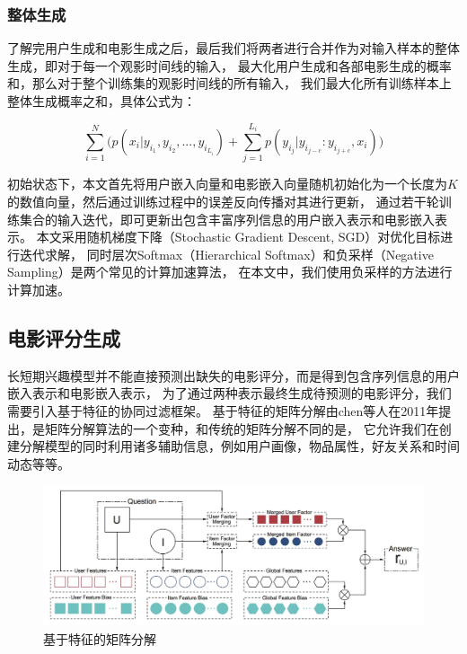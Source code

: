\subsubsection{整体生成}
了解完用户生成和电影生成之后，最后我们将两者进行合并作为对输入样本的整体生成，即对于每一个观影时间线的输入，
最大化用户生成和各部电影生成的概率和，那么对于整个训练集的观影时间线的所有输入，
我们最大化所有训练样本上整体生成概率之和，具体公式为：

\begin{equation}
\sum_{i=1}^{N} \bigg( p(x_i | y_{i_1}, y_{i_2}, ..., y_{i_{L_i}}) +
\sum_{j=1}^{L_i} p(y_{i_j} | y_{i_{j-c}} : y_{i_{j+c}}, x_i) \bigg)
\end{equation}

初始状态下，本文首先将用户嵌入向量和电影嵌入向量随机初始化为一个长度为$K$的数值向量，然后通过训练过程中的误差反向传播对其进行更新，
通过若干轮训练集合的输入迭代，即可更新出包含丰富序列信息的用户嵌入表示和电影嵌入表示。
本文采用随机梯度下降（Stochastic Gradient Descent, SGD）对优化目标进行迭代求解，
同时层次Softmax（Hierarchical Softmax）和负采样（Negative Sampling）是两个常见的计算加速算法，
在本文中，我们使用负采样的方法进行计算加速。

\subsection{电影评分生成}
长短期兴趣模型并不能直接预测出缺失的电影评分，而是得到包含序列信息的用户嵌入表示和电影嵌入表示，
为了通过两种表示最终生成待预测的电影评分，我们需要引入基于特征的协同过滤框架。
基于特征的矩阵分解由chen等人\parencite{chen2011feature}在2011年提出，是矩阵分解算法的一个变种，和传统的矩阵分解不同的是，
它允许我们在创建分解模型的同时利用诸多辅助信息，例如用户画像，物品属性，好友关系和时间动态等等。

\begin{figure}[htbp]
    \centering
    \includegraphics[scale=0.22]{images/svdfeature.jpeg}
    \caption{基于特征的矩阵分解}
    \label{fig:svdfeature}
\end{figure}

